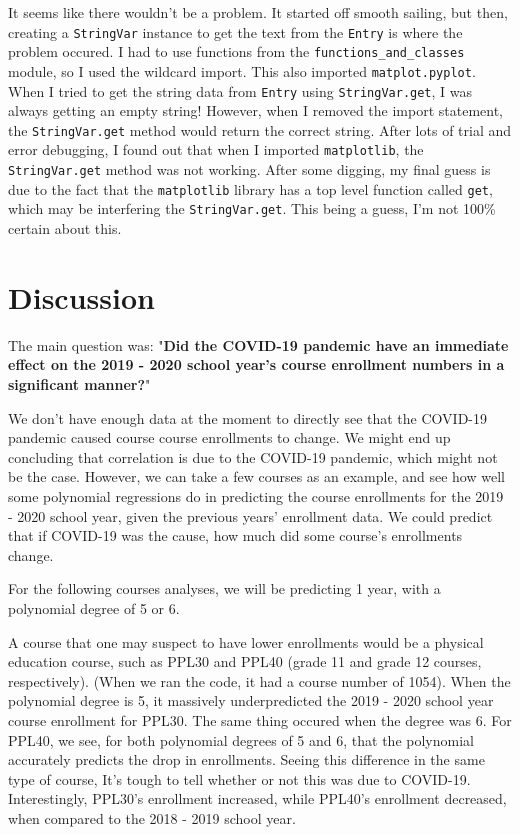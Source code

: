 \documentclass[fontsize=11pt]{article}
\begin{document}
It seems like there wouldn't be a problem. It started off smooth sailing, but then, creating a \texttt{StringVar} instance
to get the text from the \texttt{Entry} is where the problem occured. 
I had to use functions from the \texttt{functions\_and\_classes} module, so I used the wildcard import.
This also imported \texttt{matplot.pyplot}.
When I tried to get the string data from \texttt{Entry} using \texttt{StringVar.get}, I was always getting an empty string!
However, when I removed the import statement, the \texttt{StringVar.get} method would return the correct string.
After lots of trial and error debugging, I found out that when I imported \texttt{matplotlib},
the \texttt{StringVar.get} method was not working.
After some digging, my final guess is due to the fact that the \texttt{matplotlib} library has
a top level function called \texttt{get}, which may be interfering the \texttt{StringVar.get}.
This being a guess, I'm not 100\% certain about this.

\section*{Discussion}

The main question was: "\textbf{Did the COVID-19 pandemic have an immediate effect on the 2019 - 2020
school year’s course enrollment numbers in a significant manner?}"

We don't have enough data at the moment to directly see that the COVID-19 pandemic caused course course enrollments
to change. We might end up concluding that correlation is due to the COVID-19 pandemic, which might not be the case.
However, we can take a few courses as an example, and see how well some polynomial regressions
do in predicting the course enrollments for the 2019 - 2020 school year, given the previous years' enrollment data.
We could predict that if COVID-19 was the cause, how much did some course's enrollments change.

For the following courses analyses, we will be predicting 1 year, with a polynomial degree of 5 or 6.

A course that one may suspect to have lower enrollments would be a physical education course,
such as PPL30 and PPL40 (grade 11 and grade 12 courses, respectively).
(When we ran the code, it had a course number of 1054).
When the polynomial degree is 5, it massively underpredicted the 2019 - 2020 school year course enrollment for PPL30.
The same thing occured when the degree was 6.
For PPL40, we see, for both polynomial degrees of 5 and 6, that the polynomial accurately predicts the drop in enrollments.
Seeing this difference in the same type of course, It's tough to tell whether or not this was due to COVID-19.
Interestingly, PPL30's enrollment increased, while PPL40's enrollment decreased, when compared to the 2018 - 2019 school year.
\end{document}
